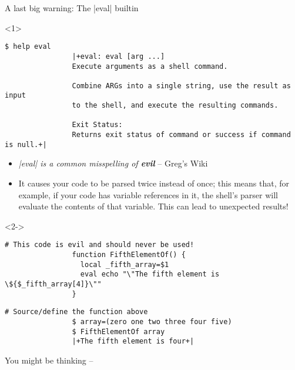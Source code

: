 \begin{frame}[fragile]{A last big warning: The \bash|eval| builtin}
    \vspace{-3mm}
    \begin{overlayarea}{\textwidth}{0.64\textheight}
        \begin{onlyenv}<1>
            \begin{lstlisting}[style=MyBash, numbers=none, xleftmargin=2mm, xrightmargin=2mm]
                $ help eval
                |+eval: eval [arg ...]
                Execute arguments as a shell command.

                Combine ARGs into a single string, use the result as input
                to the shell, and execute the resulting commands.

                Exit Status:
                Returns exit status of command or success if command is null.+|
            \end{lstlisting}
            \begin{itemize}
                \item \emph{\guillemotleft\textnormal{\bash|eval|} is a common misspelling of \textbf{evil}\guillemotright} -- Greg's Wiki
                \item It causes your code to be parsed twice instead of once; this means that, for example, if your code has variable references in it, the shell's parser will evaluate the contents of that variable.
                      This can lead to unexpected results!
            \end{itemize}
        \end{onlyenv}
        \begin{onlyenv}<2->
            \begin{lstlisting}[style=MyBash, emph={[7]_fifth_array}]
                # This code is evil and should never be used!
                function FifthElementOf() {
                  local _fifth_array=$1
                  eval echo "\"The fifth element is \${$_fifth_array[4]}\""
                }
            \end{lstlisting}
            \smallskip
            \begin{lstlisting}[style=MyBash, emph={[7]_fifth_array}, belowskip=-5mm, firstnumber=6]
                # Source/define the function above
                $ array=(zero one two three four five)
                $ FifthElementOf array
                |+The fifth element is four+|
            \end{lstlisting}
            You might be thinking --  

\end{onlyenv}
\end{overlayarea}
\end{frame}
